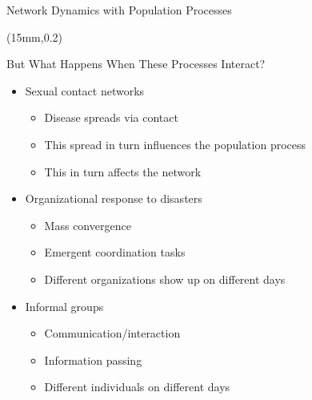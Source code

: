\documentclass[10pt]{beamer}
\begin{document}
\begin{frame}[t]{Network Dynamics with Population Processes} 

\begin{textblock*}{100mm}(15mm,0.2\textheight)
\begin{block}{But What Happens When These Processes Interact?}
\begin{itemize}
\item Sexual contact networks
\begin{itemize}
\item Disease spreads via contact
\item This spread in turn influences the population process
\item This in turn affects the network 
\end{itemize}
\item Organizational response to disasters
\begin{itemize}
\item Mass convergence
\item Emergent coordination tasks
\item Different organizations show up on different days
\end{itemize}
\item Informal groups
\begin{itemize}
\item Communication/interaction
\item Information passing
\item Different individuals on different days
\end{itemize}
\end{itemize}
\end{block}
\end{textblock*}


\end{frame}
\end{document}
